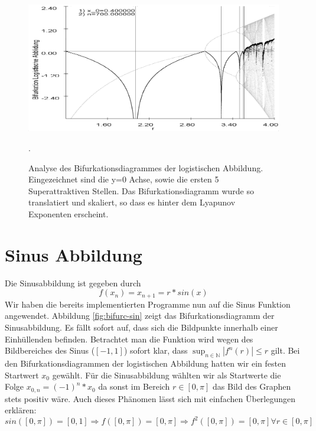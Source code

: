\documentclass{scrartcl}
\begin{document}
\begin{figure}[!htbp]
\centering
\includegraphics[scale=0.45]{iteration/bifurk-log-lyapunov-periode}
\caption{Analyse des Bifurkationsdiagrammes der logistischen Abbildung. Eingezeichnet sind die y=0 Achse, sowie die ersten 5 Superattraktiven Stellen. Das Bifurkationsdiagramm wurde so translatiert und skaliert, so dass es hinter dem Lyapunov Exponenten erscheint.}.
\label{fix:log-detail} 
\end{figure}







\section{Sinus Abbildung}
Die Sinusabbildung ist gegeben durch 
$$f(x_n)=x_{n+1}=r*sin(x)$$
Wir haben die bereits implementierten Programme nun auf die Sinus Funktion angewendet. Abbildung \ref{fig:bifurc-sin} zeigt das Bifurkationsdiagramm der Sinusabbildung. Es fällt sofort auf, dass sich die Bildpunkte innerhalb einer Einhüllenden befinden. Betrachtet man die Funktion wird wegen des Bildbereiches des Sinus ($[-1,1]$) sofort klar, dass $\sup_{n \in \mathbb{N}} |f^n(r)| \leq r $ gilt. Bei den Bifurkationsdiagrammen der logistischen Abbildung hatten wir ein festen Startwert $x_0$ gewählt. Für die Sinusabbildung wählten wir als Startwerte die Folge $x_{0,n} = (-1)^n * x_0$ da sonst im Bereich $r \in [0,\pi]$ das Bild des Graphen stets positiv wäre. Auch dieses Phänomen lässt sich mit einfachen Überlegungen erklären: 
$$sin([0,\pi]) = [0,1] \Rightarrow f([0,\pi]) = [0,\pi] \Rightarrow f^2([0,\pi]) = [0,\pi] \forall r \in [0,\pi]$$
 
\end{document}
